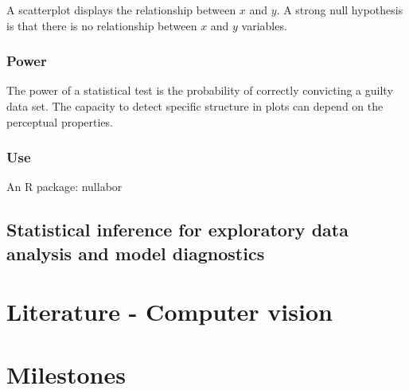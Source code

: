 \documentclass[
]{book}
\begin{document}
A scatterplot displays the relationship between \(x\) and \(y\). A strong null hypothesis is that there is no relationship between \(x\) and \(y\) variables.

\hypertarget{power}{%
\subsection{Power}\label{power}}

The power of a statistical test is the probability of correctly convicting a guilty data set. The capacity to detect specific structure in plots can depend on the perceptual properties.

\hypertarget{use}{%
\subsection{Use}\label{use}}

An R package: nullabor

\hypertarget{statistical-inference-for-exploratory-data-analysis-and-model-diagnostics}{%
\section{Statistical inference for exploratory data analysis and model diagnostics}\label{statistical-inference-for-exploratory-data-analysis-and-model-diagnostics}}

\hypertarget{literature---computer-vision}{%
\chapter{Literature - Computer vision}\label{literature---computer-vision}}

\hypertarget{milestones}{%
\chapter{Milestones}\label{milestones}}

  
\end{document}
